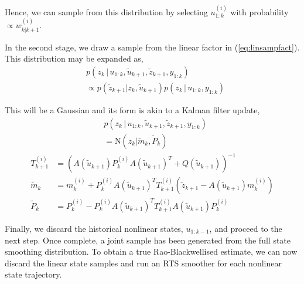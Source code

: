 \documentclass[twocolumn]{autart}    %
\begin{document}
Hence, we can sample from this distribution by selecting $u_{1:k}^{(i)}$ with probability $\propto w^{(i)}_{k|k+1}$.

In the second stage, we draw a sample from the linear factor in (\ref{eq:linsampfact}). This distribution may be expanded as,
%
\begin{equation}
\begin{split}
  &p(z_k\,|\, u_{1:k}, \tilde{u}_{k+1}, \tilde{z}_{k+1},y_{1:k}) \\
  &\propto p(\tilde{z}_{k+1} | z_k, \tilde{u}_{k+1}) p(z_k\,|\, u_{1:k}, y_{1:k})
\end{split}
\end{equation}

This will be a Gaussian and its form is akin to a Kalman filter update,
%
\begin{equation}
\begin{split}
  &p(z_k\,|\, u_{1:k}, \tilde{u}_{k+1}, \tilde{z}_{k+1},y_{1:k}) \\
  &= \mathrm{N}( z_k | \tilde{m}_k , \tilde{P}_k )
\end{split}
\end{equation}
%
\begin{equation}
\begin{split}
  T_{k+1}^{(i)} &= ( A(\tilde{u}_{k+1}) P_k^{(i)} A(\tilde{u}_{k+1})^T + Q(\tilde{u}_{k+1}) )^{-1} \\
  \tilde{m}_k &= m_k^{(i)} + P_k^{(i)} A(\tilde{u}_{k+1})^T T_{k+1}^{(i)} (\tilde{z}_{k+1} - A(\tilde{u}_{k+1}) m_k^{(i)} ) \\
  \tilde{P}_k &= P_k^{(i)} - P_k^{(i)} A(\tilde{u}_{k+1})^T T_{k+1}^{(i)} A(\tilde{u}_{k+1}) P_k^{(i)}
\end{split}
\label{eq:linsamplinupd}
\end{equation}

Finally, we discard the historical nonlinear states, $u_{1:k-1}$, and proceed to the next step. Once complete, a joint sample has been generated from the full state smoothing distribution. To obtain a true Rao-Blackwellised estimate, we can now discard the linear state samples and run an RTS smoother for each nonlinear state trajectory.
\end{document}
